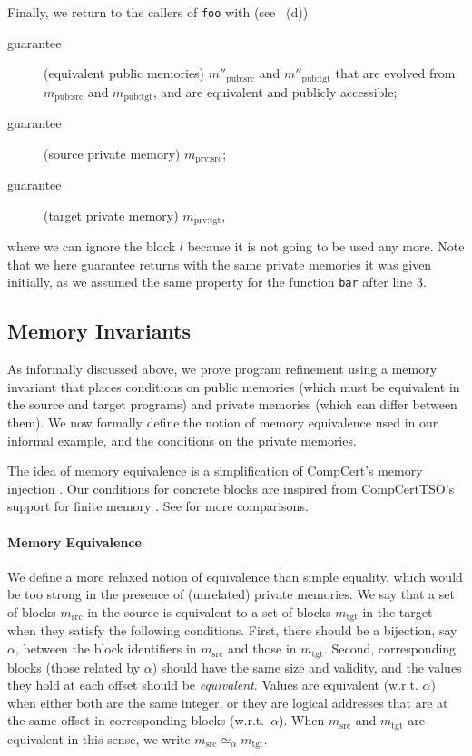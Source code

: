Finally, we return to the callers of \texttt{foo} with (see ~(d))
\begin{description}
\item[guarantee] (equivalent public memories) 
  $m''_\textrm{pub:src}$ and $m''_\textrm{pub:tgt}$
  that are evolved from $m_\textrm{pub:src}$ and $m_\textrm{pub:tgt}$,
  and are equivalent and publicly accessible;
\item[guarantee] (source private memory) 
  $m_\textrm{prv:src}$;
\item[guarantee] (target private memory) 
  $m_\textrm{prv:tgt}$,
\end{description}
where we can ignore the block $l$ because it is not going to be used any more.
Note that we here guarantee  returns with the same private memories it was given
initially, as we assumed the same property for the function
\texttt{bar} after line 3.

\subsection{Memory Invariants}
\label{reasoning:invariants}

As informally discussed above, we prove program refinement using a memory invariant that places conditions on
public memories (which must be equivalent in the source and target programs) and private memories (which can differ between them).  We now formally define the
notion of memory equivalence used in our informal
example, and the conditions on the private memories.

The idea of memory equivalence is a simplification of CompCert's
memory injection \cite{Leroy-Appel-Blazy-Stewart-memory-v2}.  Our
conditions for concrete blocks are inspired from CompCertTSO's support
for finite memory \cite{vsevvcik2013compcerttso}.  See
 for more comparisons.


\paragraph{Memory Equivalence}
We define a more relaxed notion of equivalence than simple equality,
which would be too strong in the presence of (unrelated) private
memories. We say that a set of blocks $m_\textrm{src}$ in the source
is equivalent to a set of blocks $m_\textrm{tgt}$ in the target
when they satisfy the following conditions. First, there should be a
bijection, say $\alpha$, between the block identifiers in
$m_\textrm{src}$ and those in $m_\textrm{tgt}$. Second, corresponding
blocks (\ie those related by $\alpha$) should have the same
size and validity, and the values they hold at each offset should be \emph{equivalent}.  Values are
equivalent (w.r.t. $\alpha$) when either both are the same integer, or
they are logical addresses that are at the same offset in corresponding blocks
(w.r.t.~$\alpha$). When $m_\textrm{src}$ and $m_\textrm{tgt}$ are equivalent in this sense, we write $m_\textrm{src} \simeq_\alpha m_\textrm{tgt}$.

